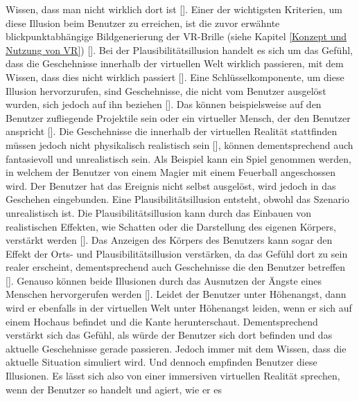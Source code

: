 \documentclass[a4paper,12pt,oneside]{article}
\begin{document}
        Wissen, dass man nicht wirklich dort ist [\cite{Slater2009}]. Einer der wichtigsten
        Kriterien, um diese Illusion beim Benutzer zu erreichen, ist die zuvor erwähnte
        blickpunktabhängige Bildgenerierung der VR-Brille (siehe Kapitel 
        \ref{Konzept und Nutzung von VR}) [\cite[18]{Dorner2019}]. 
        Bei der Plausibilitätsillusion handelt
        es sich um das Gefühl, dass die Geschehnisse innerhalb der virtuellen Welt 
        wirklich passieren, mit dem Wissen, dass dies nicht wirklich passiert
        [\cite{Slater2009}]. Eine Schlüsselkomponente, um diese Illusion hervorzurufen,
        sind Geschehnisse, die nicht vom Benutzer ausgelöst wurden, sich jedoch auf ihn
        beziehen [\cite{Slater2009}]. Das können beispielsweise auf den Benutzer zufliegende
        Projektile sein oder ein virtueller Mensch, der den Benutzer anspricht
        [\cite[18-19]{Dorner2019}]. Die Geschehnisse die innerhalb der virtuellen Realität
        stattfinden müssen jedoch nicht physikalisch realistisch sein [\cite{Slater2009}], 
        können dementsprechend auch fantasievoll und unrealistisch sein. Als Beispiel kann
        ein Spiel genommen werden, in welchem der Benutzer von einem Magier mit einem 
        Feuerball angeschossen wird. Der Benutzer hat das Ereignis nicht selbst ausgelöst,
        wird jedoch in das Geschehen eingebunden. Eine Plausibilitätsillusion entsteht,
        obwohl das Szenario unrealistisch ist. Die Plausibilitätsillusion kann durch das
        Einbauen von realistischen Effekten, wie Schatten oder die Darstellung des eigenen
        Körpers, verstärkt werden [\cite{Slater2009}]. Das Anzeigen des Körpers des Benutzers
        kann sogar den Effekt der Orts- und Plausibilitätsillusion verstärken, da das
        Gefühl dort zu sein realer erscheint, dementsprechend auch Geschehnisse die den
        Benutzer betreffen [\cite{Slater2009}]. Genauso können beide Illusionen durch das
        Ausnutzen der Ängste eines Menschen hervorgerufen werden [\cite{Slater2009}].
        Leidet der Benutzer unter Höhenangst, dann wird er ebenfalls in der virtuellen
        Welt unter Höhenangst leiden, wenn er sich auf einem Hochaus befindet und die
        Kante herunterschaut. Dementsprechend verstärkt sich das Gefühl, als würde der
        Benutzer sich dort befinden und das aktuelle Geschehnisse gerade passieren. Jedoch
        immer mit dem Wissen, dass die aktuelle Situation simuliert wird. Und dennoch
        empfinden Benutzer diese Illusionen. Es lässt sich also von einer immersiven
        virtuellen Realität sprechen, wenn der Benutzer so handelt und agiert, wie er es
\end{document}
